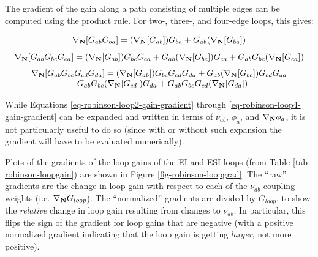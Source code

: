The gradient of the gain along a path consisting of multiple edges can be
computed using the product rule. For two-, three-, and four-edge loops,
this gives:

\begin{equation}
\nabla_{\mathbf{N}} [ G_{ab} G_{ba} ] =
( \nabla_{\mathbf{N}} [ G_{ab} ] ) G_{ba} + G_{ab} ( \nabla_{\mathbf{N}} [ G_{ba} ] )
\label{eq-robinson-loop2-gain-gradient}
\end{equation}
%
\begin{equation}
\nabla_{\mathbf{N}} [ G_{ab} G_{bc} G_{ca} ] =
( \nabla_{\mathbf{N}} [ G_{ab} ] ) G_{bc} G_{ca} + G_{ab} ( \nabla_{\mathbf{N}} [ G_{bc} ] ) G_{ca}
+ G_{ab} G_{bc} ( \nabla_{\mathbf{N}} [ G_{ca} ] )
\label{eq-robinson-loop3-gain-gradient}
\end{equation}
%
\begin{equation}
\begin{array}{c}
\nabla_{\mathbf{N}} [ G_{ab} G_{bc} G_{cd} G_{da} ] =
( \nabla_{\mathbf{N}} [ G_{ab} ] ) G_{bc} G_{cd} G_{da}
+ G_{ab} ( \nabla_{\mathbf{N}} [ G_{bc} ] ) G_{cd} G_{da}
\\
+ G_{ab} G_{bc} ( \nabla_{\mathbf{N}} [ G_{cd} ] ) G_{da}
+ G_{ab} G_{bc} G_{cd} ( \nabla_{\mathbf{N}} [ G_{da} ] )
\end{array}
\label{eq-robinson-loop4-gain-gradient}
\end{equation}

While Equations \ref{eq-robinson-loop2-gain-gradient} through
\ref{eq-robinson-loop4-gain-gradient} can be expanded and written in terms
of $\nu_{ab}$, $\phi_{a}$, and $\nabla_{\mathbf{N}} \phi_{a}$, it is not particularly
useful to do so (since with or without such expansion the gradient will
have to be evaluated numerically).

Plots of the gradients of the loop gains of the EI and ESI loops (from
Table \ref{tab-robinson-loopgain}) are shown in Figure
\ref{fig-robinson-loopgrad}. The ``raw'' gradients are the change in loop
gain with respect to each of the $\nu_{ab}$ coupling weights (i.e.
$\nabla_{\mathbf{N}} G_{loop}$). The ``normalized'' gradients are divided by $G_{loop}$,
to show the \textit{relative} change in loop gain resulting from changes
to $\nu_{ab}$. In particular, this flips the sign of the gradient for
loop gains that are negative (with a positive normalized gradient indicating
that the loop gain is getting \textit{larger}, not more positive).

